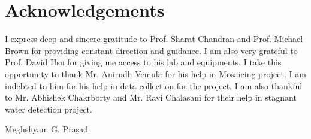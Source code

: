 \documentclass[11pt]{article}
\begin{document}
\def\title{Quadcopter Based Applications in Imaging}
\def\what{Third Annual Progress Report}
\def\degree{Doctor of Philosophy}
\def\who{Meghshyam G. Prasad}
\def\roll{124058001}
\def\guide{Prof. Sharat Chandran \\ Prof. Michael Brown}
\titlpage
\def\bsq{\begin{flushright} $\blacksquare$\\ \end{flushright}}
\def\tab{\hspace{5mm}}

\newpage
\section*{Acknowledgements}
I express deep and sincere gratitude to Prof. Sharat Chandran and Prof.
Michael Brown for providing constant direction and guidance. I am also
very grateful to Prof. David Hsu for giving me access to his lab and
equipments. I take this opportunity to thank Mr. Anirudh Vemula 
for his help in Mosaicing project. I am indebted to him for his help in data
collection for the project. I am also thankful to Mr. Abhishek Chakrborty and
Mr. Ravi Chalasani for their help in stagnant water detection project.

\begin{flushright}
Meghshyam G. Prasad
\end{flushright}
\end{document}
